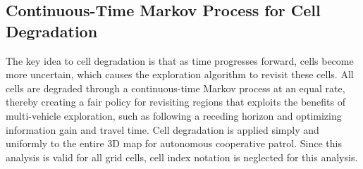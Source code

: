 \subsection{Continuous-Time Markov Process for Cell Degradation}

The key idea to cell degradation is that as time progresses forward, cells become more uncertain, which causes the exploration algorithm to revisit these cells. All cells are degraded through a continuous-time Markov process at an equal rate, thereby creating a fair policy for revisiting regions that exploits the benefits of multi-vehicle exploration, such as following a receding horizon and optimizing information gain and travel time. Cell degradation is applied simply and uniformly to the entire 3D map for autonomous cooperative patrol. Since this analysis is valid for all grid cells, cell index notation is neglected for this analysis.

